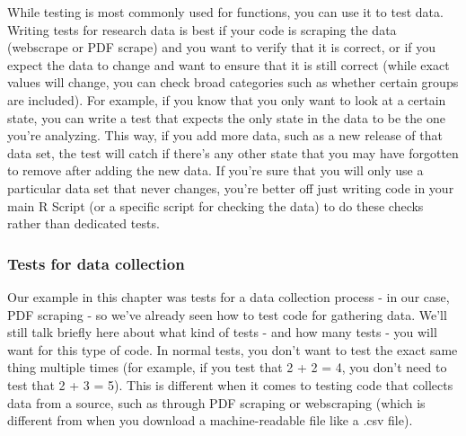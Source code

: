 \documentclass[
  12pt,
  openany]{book}
\begin{document}
While testing is most commonly used for functions, you can use it to test data. Writing tests for research data is best if your code is scraping the data (webscrape or PDF scrape) and you want to verify that it is correct, or if you expect the data to change and want to ensure that it is still correct (while exact values will change, you can check broad categories such as whether certain groups are included). For example, if you know that you only want to look at a certain state, you can write a test that expects the only state in the data to be the one you're analyzing. This way, if you add more data, such as a new release of that data set, the test will catch if there's any other state that you may have forgotten to remove after adding the new data. If you're sure that you will only use a particular data set that never changes, you're better off just writing code in your main R Script (or a specific script for checking the data) to do these checks rather than dedicated tests.

\hypertarget{tests-for-data-collection}{%
\subsubsection{Tests for data collection}\label{tests-for-data-collection}}

Our example in this chapter was tests for a data collection process - in our case, PDF scraping - so we've already seen how to test code for gathering data. We'll still talk briefly here about what kind of tests - and how many tests - you will want for this type of code. In normal tests, you don't want to test the exact same thing multiple times (for example, if you test that 2 + 2 = 4, you don't need to test that 2 + 3 = 5). This is different when it comes to testing code that collects data from a source, such as through PDF scraping or webscraping (which is different from when you download a machine-readable file like a .csv file).
\end{document}
